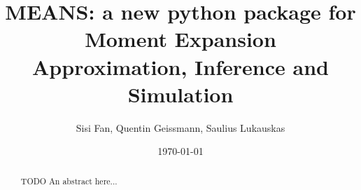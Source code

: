 \documentclass[11pt,a4paper]{article}
\begin{document}
\title{MEANS: a new python package for Moment Expansion Approximation, Inference and Simulation}
\author{Sisi Fan, Quentin Geissmann, Saulius Lukauskas}
\date{\today}

\maketitle


    \begin{abstract}
    TODO An abstract here...
	\end{abstract}
\newpage{}

\newpage{}

\newpage{}

\newpage{}

\newpage{}
{}

   
\end{document}
